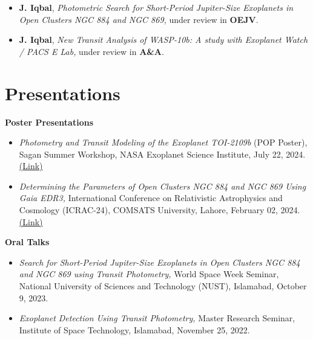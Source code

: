 \documentclass{article}
\begin{document}
\begin{itemize}
    \item \textbf{J. Iqbal}, \textit{Photometric Search for Short-Period Jupiter-Size Exoplanets in Open Clusters NGC 884 and NGC 869,} under review in \textbf{OEJV}.
    \item \textbf{J. Iqbal}, \textit{New Transit Analysis of WASP-10b: A study with Exoplanet Watch / PACS E Lab,} under review in \textbf{A\&A}.
    \end{itemize}
\section*{Presentations}
\vspace{-\baselineskip}
\noindent\makebox[\linewidth]{\rule{\textwidth}{0.4pt}}
\textbf{Poster Presentations}
\begin{itemize}
    \item \textit{Photometry and Transit Modeling of the Exoplanet TOI-2109b} (POP Poster), Sagan Summer Workshop, NASA Exoplanet Science Institute, July 22, 2024. \href{https://nexsci.caltech.edu/workshop/2024/posters/Poster_JavedIqbal_49.pdf}{(Link)}
    \item \textit{Determining the Parameters of Open Clusters NGC 884 and NGC 869 Using Gaia EDR3,} International Conference on Relativistic Astrophysics and Cosmology (ICRAC-24), COMSATS University, Lahore,  February 02, 2024. \href{https://lahore.comsats.edu.pk/ICRAC2024/program.aspx}{(Link)}
\end{itemize}

\textbf{Oral Talks}
\begin{itemize}
    \item \textit{Search for Short-Period Jupiter-Size Exoplanets in Open Clusters NGC 884 and NGC 869 using Transit Photometry,} World Space Week Seminar, National University of Sciences and Technology (NUST), Islamabad, October 9, 2023.
    \item \textit{Exoplanet Detection Using Transit Photometry,} Master Research Seminar, Institute of Space Technology, Islamabad, November 25, 2022.
    \end{itemize}
    
\end{document}
